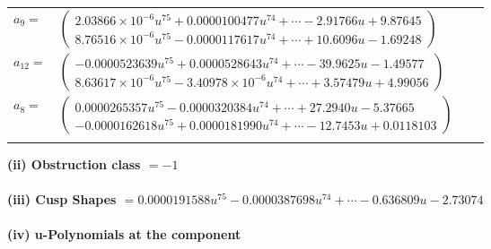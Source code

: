 \documentclass[1p]{elsarticle_modified}
\theoremstyle{definition}
\begin{document}
\begin{tabular}{m{7pt} m{180pt} m{7pt} m{180pt} }
\flushright $a_{9}=$&$\begin{pmatrix}2.03866\times10^{-6} u^{75}+0.0000100477 u^{74}+\cdots-2.91766 u+9.87645\\8.76516\times10^{-6} u^{75}-0.0000117617 u^{74}+\cdots+10.6096 u-1.69248\end{pmatrix}$ \\
\flushright $a_{12}=$&$\begin{pmatrix}-0.0000523639 u^{75}+0.0000528643 u^{74}+\cdots-39.9625 u-1.49577\\8.63617\times10^{-6} u^{75}-3.40978\times10^{-6} u^{74}+\cdots+3.57479 u+4.99056\end{pmatrix}$ \\
\flushright $a_{8}=$&$\begin{pmatrix}0.0000265357 u^{75}-0.0000320384 u^{74}+\cdots+27.2940 u-5.37665\\-0.0000162618 u^{75}+0.0000181990 u^{74}+\cdots-12.7453 u+0.0118103\end{pmatrix}$\\&\end{tabular}
\flushleft \textbf{(ii) Obstruction class $= -1$}\\~\\
\flushleft \textbf{(iii) Cusp Shapes $= 0.0000191588 u^{75}-0.0000387698 u^{74}+\cdots-0.636809 u-2.73074$}\\~\\
\newpage\renewcommand{\arraystretch}{1}
\flushleft \textbf{(iv) u-Polynomials at the component}\newline \\
\end{document}
